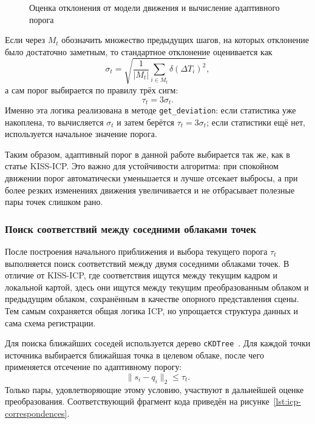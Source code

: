 \begin{figure}
  \fontsize{12pt}{14pt}\selectfont
  
  \caption{Оценка отклонения от модели движения и вычисление адаптивного порога}
  \label{lst:icp-deviation}
\end{figure}

Если через \(M_t\) обозначить множество предыдущих шагов, на которых отклонение было достаточно заметным, то стандартное отклонение оценивается как
\begin{equation}
    \sigma_t = \sqrt{\frac{1}{|M_t|} \sum_{i \in M_t} \delta(\Delta T_i)^2},
\end{equation}
а сам порог выбирается по правилу трёх сигм:
\begin{equation}
    \tau_t = 3 \sigma_t.
\end{equation}
Именно эта логика реализована в методе \texttt{get\_deviation}: если статистика уже накоплена, то вычисляется \(\sigma_t\) и затем берётся \(\tau_t = 3\sigma_t\); если статистики ещё нет, используется начальное значение порога.

Таким образом, адаптивный порог в данной работе выбирается так же, как в статье KISS-ICP. Это важно для устойчивости алгоритма: при спокойном движении порог автоматически уменьшается и лучше отсекает выбросы, а при более резких изменениях движения увеличивается и не отбрасывает полезные пары точек слишком рано.

\subsubsection{Поиск соответствий между соседними облаками точек}

После построения начального приближения и выбора текущего порога \(\tau_t\) выполняется поиск соответствий между двумя соседними облаками точек. В отличие от KISS-ICP, где соответствия ищутся между текущим кадром и локальной картой, здесь они ищутся между текущим преобразованным облаком и предыдущим облаком, сохранённым в качестве опорного представления сцены. Тем самым сохраняется общая логика ICP, но упрощается структура данных и сама схема регистрации.

Для поиска ближайших соседей используется дерево \texttt{cKDTree}~\cite{scipy-ckdtree}. Для каждой точки источника выбирается ближайшая точка в целевом облаке, после чего применяется отсечение по адаптивному порогу:
\begin{equation}
    \|s_i - q_i\|_2 \leq \tau_t.
\end{equation}
Только пары, удовлетворяющие этому условию, участвуют в дальнейшей оценке преобразования. Соответствующий фрагмент кода приведён на рисунке~\ref{lst:icp-correspondences}.

